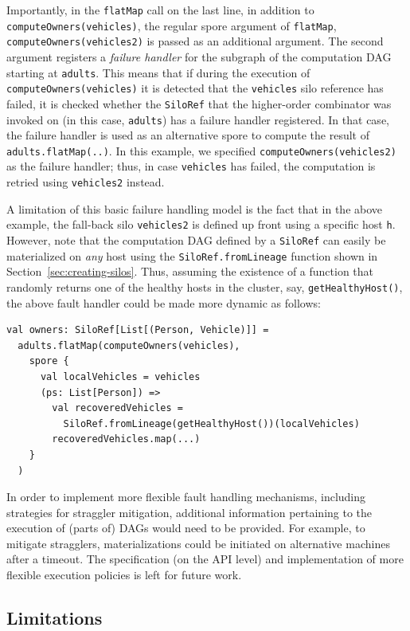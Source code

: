 \documentclass{jfp1}
\begin{document}
Importantly, in the \verb|flatMap| call on the last line, in addition to
\verb|computeOwners(vehicles)|, the regular spore argument of \verb|flatMap|,
\verb|computeOwners(vehicles2)| is passed as an additional argument. The second
argument registers a {\em failure handler} for the subgraph of the computation
DAG starting at \verb|adults|. This means that if during the execution of
\verb|computeOwners(vehicles)| it is detected that the \verb|vehicles| silo
reference has failed, it is checked whether the \verb|SiloRef| that the
higher-order combinator was invoked on (in this case, \verb|adults|) has a
failure handler registered. In that case, the failure handler is used as an
alternative spore to compute the result of \verb|adults.flatMap(..)|. In this
example, we specified \verb|computeOwners(vehicles2)| as the failure handler;
thus, in case \verb|vehicles| has failed, the computation is retried using
\verb|vehicles2| instead.

A limitation of this basic failure handling model is the fact that in
the above example, the fall-back silo \verb|vehicles2| is defined up
front using a specific host \verb|h|. However, note that the
computation DAG defined by a \verb|SiloRef| can easily be materialized
on {\em any} host using the \verb|SiloRef.fromLineage| function shown
in Section~\ref{sec:creating-silos}. Thus, assuming the existence of a
function that randomly returns one of the healthy hosts in the
cluster, say, \verb|getHealthyHost()|, the above fault handler could
be made more dynamic as follows:

\begin{lstlisting}
val owners: SiloRef[List[(Person, Vehicle)]] =
  adults.flatMap(computeOwners(vehicles),
    spore {
      val localVehicles = vehicles
      (ps: List[Person]) =>
        val recoveredVehicles =
          SiloRef.fromLineage(getHealthyHost())(localVehicles)
        recoveredVehicles.map(...)
    }
  )
\end{lstlisting}

In order to implement more flexible fault handling mechanisms,
including strategies for straggler mitigation, additional information
pertaining to the execution of (parts of) DAGs would need to be
provided. For example, to mitigate stragglers, materializations could
be initiated on alternative machines after a timeout. The
specification (on the API level) and implementation of more flexible
execution policies is left for future work.

\subsection{Limitations}
\end{document}

